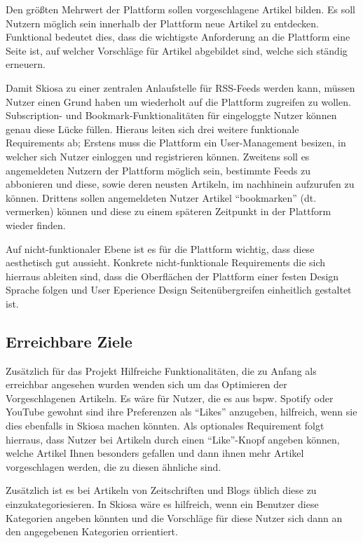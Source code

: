 Den größten Mehrwert der Plattform sollen vorgeschlagene Artikel bilden.
Es soll Nutzern möglich sein innerhalb der Plattform neue Artikel zu entdecken.
Funktional bedeutet dies, dass die wichtigste Anforderung an die Plattform eine Seite ist, auf welcher Vorschläge für Artikel abgebildet sind, welche sich ständig erneuern.

Damit Skiosa zu einer zentralen Anlaufstelle für RSS-Feeds werden kann, müssen Nutzer einen Grund haben um wiederholt auf die Plattform zugreifen zu wollen.
Subscription- und Bookmark-Funktionalitäten für eingeloggte Nutzer können genau diese Lücke füllen.
Hieraus leiten sich drei weitere funktionale Requirements ab;
Erstens muss die Plattform ein User-Management besizen, in welcher sich Nutzer einloggen und registrieren können.
Zweitens soll es angemeldeten Nutzern der Plattform möglich sein, bestimmte Feeds zu abbonieren und diese, sowie deren neusten Artikeln, im nachhinein aufzurufen zu können.
Drittens sollen angemeldeten Nutzer Artikel ``bookmarken'' (dt. vermerken) können und diese zu einem späteren Zeitpunkt in der Plattform wieder finden.

Auf nicht-funktionaler Ebene ist es für die Plattform wichtig, dass diese aesthetisch gut aussieht.
Konkrete nicht-funktionale Requirements die sich hierraus ableiten sind, dass die Oberflächen der Plattform einer festen Design Sprache folgen und User Eperience Design Seitenübergreifen einheitlich gestaltet ist.

\subsection{Erreichbare Ziele}
Zusätzlich für das Projekt Hilfreiche Funktionalitäten, die zu Anfang als erreichbar angesehen wurden wenden sich um das Optimieren der Vorgeschlagenen Artikeln.
Es wäre für Nutzer, die es aus bspw. Spotify oder YouTube gewohnt sind ihre Preferenzen als ``Likes'' anzugeben, hilfreich, wenn sie dies ebenfalls in Skiosa machen könnten.
Als optionales Requirement folgt hierraus, dass Nutzer bei Artikeln durch einen ``Like''-Knopf angeben können, welche Artikel Ihnen besonders gefallen und dann ihnen mehr Artikel vorgeschlagen werden, die zu diesen ähnliche sind.

Zusätzlich ist es bei Artikeln von Zeitschriften und Blogs üblich diese zu einzukategoriesieren.
In Skiosa wäre es hilfreich, wenn ein Benutzer diese Kategorien angeben könnten und die Vorschläge für diese Nutzer sich dann an den angegebenen Kategorien orrientiert.

